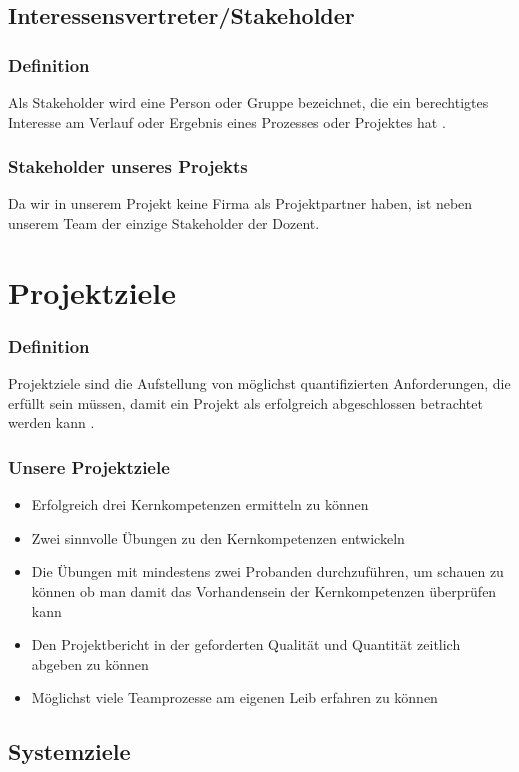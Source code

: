 \subsection{Interessensvertreter/Stakeholder}
\subsubsection{Definition}
Als Stakeholder wird eine Person oder Gruppe bezeichnet, die ein berechtigtes Interesse am Verlauf oder Ergebnis eines Prozesses oder Projektes hat \cite{wiki:Stakeholder}.

\subsubsection{Stakeholder unseres Projekts}
Da wir in unserem Projekt keine Firma als Projektpartner haben, ist neben unserem Team der einzige Stakeholder der Dozent. 
\section{Projektziele}
\subsubsection{Definition}
Projektziele sind die Aufstellung von möglichst quantifizierten Anforderungen, die erfüllt sein müssen, damit ein Projekt als erfolgreich abgeschlossen betrachtet werden kann \cite{ wiki:Projektziel}.
\subsubsection{Unsere Projektziele}
\begin{itemize}
\item Erfolgreich drei Kernkompetenzen ermitteln zu können
\item Zwei sinnvolle Übungen zu den Kernkompetenzen entwickeln
\item Die Übungen mit mindestens zwei Probanden durchzuführen, um schauen zu können ob man damit das Vorhandensein der Kernkompetenzen überprüfen kann
\item Den Projektbericht in der geforderten Qualität und Quantität zeitlich abgeben zu können
\item Möglichst viele Teamprozesse am eigenen Leib erfahren zu können
\end{itemize} 

\subsection{Systemziele}
